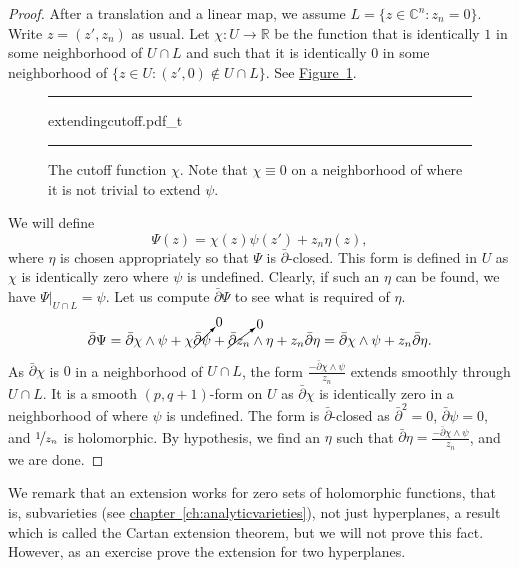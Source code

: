 \documentclass[12pt,openany]{book}
\newcommand{\C}{{\mathbb{C}}}
\newcommand{\R}{{\mathbb{R}}}
\theoremstyle{plain}
\theoremstyle{remark}
\theoremstyle{definition}
\newenvironment{myfig}{%
\begin{figure}[h!t]
\noindent\rule{\textwidth}{0.5pt}\vspace{12pt}\par\centering}%
{\par\noindent\rule{\textwidth}{0.5pt}
\end{figure}}
\theoremstyle{exercise}
\theoremstyle{example}
\newcommand{\figureref}[1]{\hyperref[#1]{Figure~\ref*{#1}}}
\newcommand{\chapterref}[1]{\hyperref[#1]{chapter~\ref*{#1}}}
\begin{document}
\begin{proof}
After a translation and a linear map, we assume
$L = \{ z \in \C^n : z_n = 0 \}$.  Write $z = (z',z_n)$ as usual.
Let $\chi \colon U \to \R$ be the function that is identically $1$ in some
neighborhood of $U \cap L$ and such that it is identically $0$ in some
neighborhood of $\{ z \in U : (z',0) \notin U \cap L \}$.
See \figureref{fig:extendingcutoff}.

\begin{myfig}
{extendingcutoff.pdf_t}
\caption{The cutoff function $\chi$.
Note that $\chi \equiv 0$ on a neighborhood of where it is not trivial
to extend $\psi$.\label{fig:extendingcutoff}}
\end{myfig}

We will define
\begin{equation*}
\Psi(z) = \chi(z) \psi(z') + z_n \eta(z) ,
\end{equation*}
where $\eta$ is chosen appropriately so that $\Psi$ is
$\bar{\partial}$-closed.  This form is defined in
$U$ as $\chi$ is identically zero where $\psi$ is undefined.
Clearly, if such an $\eta$ can be found,
we have $\Psi|_{U \cap L} = \psi$.
Let us compute
$\bar{\partial} \Psi$
to see what is required of $\eta$.
\begin{equation*}
\bar{\partial} \Psi =
\bar{\partial}\chi \wedge \psi
+ \chi \cancelto{0}{\bar{\partial} \psi}
 + \cancelto{0}{\bar{\partial} z_n} \wedge \eta
 + z_n \bar{\partial} \eta
=
\bar{\partial}\chi \wedge \psi
 + z_n \bar{\partial} \eta .
\end{equation*}
As $\bar{\partial} \chi$ is $0$ in a neighborhood of $U \cap L$,
the form $\frac{- \bar{\partial}\chi \wedge \psi}{z_n}$ extends smoothly
through $U \cap L$.
It is a
smooth $(p,q+1)$-form on $U$ as
$\bar{\partial}\chi$ is identically zero in a neighborhood of
where $\psi$ is undefined.
The form is
$\bar{\partial}$-closed as $\bar{\partial}^2 = 0$, $\bar{\partial}\psi = 0$,
and $\nicefrac{1}{z_n}$ is holomorphic.
By hypothesis, we find an $\eta$ such that
$\bar{\partial} \eta = \frac{- \bar{\partial}\chi \wedge \psi}{z_n}$,
and we are done.
\end{proof}

We remark that an extension works for zero sets of holomorphic functions, that
is, subvarieties
(see \chapterref{ch:analyticvarieties}), not just
hyperplanes, a result which is called the Cartan extension theorem, but we will
not prove this fact.  However, as an exercise prove the extension for
two hyperplanes.
\end{document}
